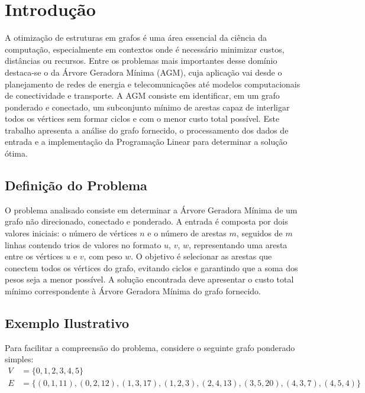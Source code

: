 \section{Introdução}%
\label{sec:introducao}

A otimização de estruturas em grafos é uma área essencial da ciência da computação, especialmente em contextos onde é necessário minimizar custos, distâncias ou recursos. Entre os problemas mais importantes desse domínio destaca-se o da Árvore Geradora Mínima (AGM), cuja aplicação vai desde o planejamento de redes de energia e telecomunicações até modelos computacionais de conectividade e transporte. A AGM consiste em identificar, em um grafo ponderado e conectado, um subconjunto mínimo de arestas capaz de interligar todos os vértices sem formar ciclos e com o menor custo total possível. Este trabalho apresenta a análise do grafo fornecido, o processamento dos dados de entrada e a implementação da Programação Linear para determinar a solução ótima.

\subsection{Definição do Problema}%
\label{sec:definicao}

O problema analisado consiste em determinar a Árvore Geradora Mínima de um grafo não direcionado, conectado e ponderado. A entrada é composta por dois valores iniciais: o número de vértices $n$ e o número de arestas $m$, seguidos de $m$ linhas contendo trios de valores no formato $u$, $v$, $w$, representando uma aresta entre os vértices $u$ e $v$, com peso $w$. O objetivo é selecionar as arestas que conectem todos os vértices do grafo, evitando ciclos e garantindo que a soma dos pesos seja a menor possível. A solução encontrada deve apresentar o custo total mínimo correspondente à Árvore Geradora Mínima do grafo fornecido.

\subsection{Exemplo Ilustrativo}%
\label{sec:exemplo}

Para facilitar a compreensão do problema, considere o seguinte grafo ponderado simples:
\[
\begin{aligned}
V &= \{0, 1, 2, 3, 4, 5\} \\
E &= \{(0,1,11), (0,2,12), (1,3,17), (1,2,3), (2,4,13), (3,5,20), (4,3,7), (4,5,4)\}
\end{aligned}
\]

